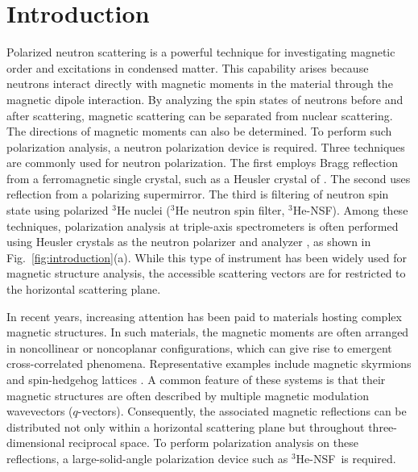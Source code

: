 \documentclass[%
 reprint,
superscriptaddress,
 amsmath,amssymb,
 aps,
floatfix,
]{revtex4-2}
\newcommand{\He}{$^3$He }
\newcommand{\Hensf}{$^3$He-NSF}
\begin{document}
\section{Introduction}
Polarized neutron scattering is a powerful technique for investigating magnetic order and excitations in condensed matter.
This capability arises because neutrons interact directly with magnetic moments in the material through the magnetic dipole interaction.
By analyzing the spin states of neutrons before and after scattering, magnetic scattering can be separated from nuclear scattering.
The directions of magnetic moments can also be determined.
To perform such polarization analysis, a neutron polarization device is required.
Three techniques are commonly used for neutron polarization.
The first employs Bragg reflection from a ferromagnetic single crystal, such as a Heusler crystal of .
The second uses reflection from a polarizing supermirror.
The third is filtering of neutron spin state using polarized \He nuclei (\He neutron spin filter, \Hensf).
Among these techniques, polarization analysis at triple-axis spectrometers is often performed using Heusler crystals as the neutron polarizer and analyzer \cite{kulda_in20_2002,faulhaber_polarized_2010,fernandez-baca_triple-axis_2008,takeda_double_2008,nakajima_polarized_2024}, as shown in Fig.~\ref{fig:introduction}(a).
While this type of instrument has been widely used for magnetic structure analysis, the accessible scattering vectors are for restricted to the horizontal scattering plane.

In recent years, increasing attention has been paid to materials hosting complex magnetic structures.
In such materials, the magnetic moments are often arranged in noncollinear or noncoplanar configurations, which can give rise to emergent cross-correlated phenomena.
Representative examples include magnetic skyrmions and spin-hedgehog lattices \cite{muhlbauer_skyrmion_2009,tokura_multiferroics_2014}.
A common feature of these systems is that their magnetic structures are often described by multiple magnetic modulation wavevectors ($q$-vectors).
Consequently, the associated magnetic reflections can be distributed not only within a horizontal scattering plane but throughout three-dimensional reciprocal space.
To perform polarization analysis on these reflections, a large-solid-angle polarization device such as \Hensf~is required.
\end{document}
